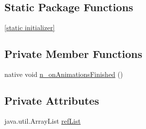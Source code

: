 \subsection*{Static Package Functions}
\begin{CompactItemize}
\item 
\hyperlink{classmono_1_1android_1_1support_1_1v7_1_1widget_1_1_recycler_view___item_animator___item_animator_finished_listener_implementor_fd313a366a4cefc9d430f5ca3976b208}{\mbox{[}static initializer\mbox{]}}
\end{CompactItemize}
\subsection*{Private Member Functions}
\begin{CompactItemize}
\item 
native void \hyperlink{classmono_1_1android_1_1support_1_1v7_1_1widget_1_1_recycler_view___item_animator___item_animator_finished_listener_implementor_b1d39bc777b77d18c5816d5655b75ace}{n\_\-onAnimationsFinished} ()
\end{CompactItemize}
\subsection*{Private Attributes}
\begin{CompactItemize}
\item 
java.util.ArrayList \hyperlink{classmono_1_1android_1_1support_1_1v7_1_1widget_1_1_recycler_view___item_animator___item_animator_finished_listener_implementor_344f55b7c2a70e0e1324a0da8eadb6ac}{refList}
\end{CompactItemize}


